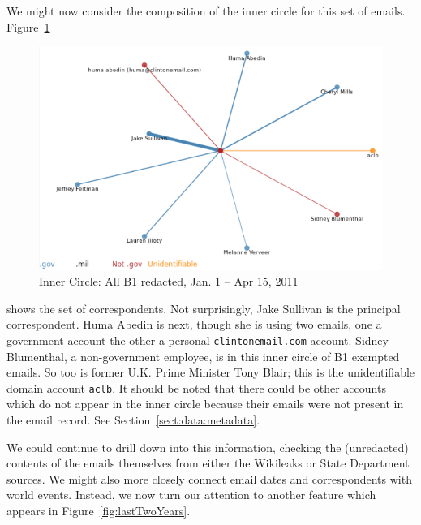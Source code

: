 \documentclass[journal]{vgtc}                %
\begin{document}
We might now consider the composition of the inner circle for this set of emails.  Figure~\ref{fig:InnerCircle2011B1LibyaBuildup} 
\begin{figure}[h]
\begin{center}
\includegraphics[width=0.95\linewidth]{InnerCircle2011B1LibyaBuildup}
\caption{Inner Circle: All  B1 redacted, Jan. 1 -- Apr 15, 2011}
\label{fig:InnerCircle2011B1LibyaBuildup}
\end{center}
\end{figure}
shows the set of correspondents.  Not surprisingly, Jake Sullivan is the principal correspondent.  Huma Abedin is next, though she is using two emails, one a government account the other a personal \texttt{clintonemail.com} account.   Sidney Blumenthal, a non-government employee, is in this inner circle of B1 exempted emails.  So too is former U.K. Prime Minister Tony Blair; this is the unidentifiable domain account \texttt{aclb}.
It should be noted that there could be other accounts which do not appear in the inner circle because their emails were not present in the email record.  See Section~\ref{sect:data:metadata}.

We could continue to drill down into this information, checking the (unredacted) contents of the emails themselves from either the Wikileaks or State Department sources.  We might also more closely connect email dates and correspondents with world events.   Instead, we now turn our attention to another feature which appears in Figure~\ref{fig:lastTwoYears}.
\end{document}
